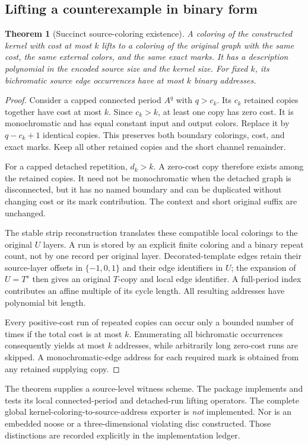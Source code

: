\documentclass[11pt]{article}
\newtheorem{theorem}{Theorem}[section]
\theoremstyle{remark}\newtheorem{remark}[theorem]{Remark}
\begin{document}
\subsection{Lifting a counterexample in binary form}
\begin{theorem}[Succinct source-coloring existence]\label{thm:lift}
A coloring of the constructed kernel with cost at most $k$ lifts to a coloring of the original graph with the same cost, the same external colors, and the same exact marks. It has a description polynomial in the encoded source size and the kernel size. For fixed $k$, its bichromatic source edge occurrences have at most $k$ binary addresses.
\end{theorem}
\begin{proof}
Consider a capped connected period $A^q$ with $q>c_k$. Its $c_k$ retained copies together have cost at most $k$. Since $c_k>k$, at least one copy has zero cost. It is monochromatic and has equal constant input and output colors. Replace it by $q-c_k+1$ identical copies. This preserves both boundary colorings, cost, and exact marks. Keep all other retained copies and the short channel remainder.

For a capped detached repetition, $d_k>k$. A zero-cost copy therefore exists among the retained copies. It need not be monochromatic when the detached graph is disconnected, but it has no named boundary and can be duplicated without changing cost or its mark contribution. The context and short original suffix are unchanged.

The stable strip reconstruction translates these compatible local colorings to the original $U$ layers. A run is stored by an explicit finite coloring and a binary repeat count, not by one record per original layer. Decorated-template edges retain their source-layer offsets in $\{-1,0,1\}$ and their edge identifiers in $U$; the expansion of $U=T^s$ then gives an original $T$-copy and local edge identifier. A full-period index contributes an affine multiple of its cycle length. All resulting addresses have polynomial bit length.

Every positive-cost run of repeated copies can occur only a bounded number of times if the total cost is at most $k$. Enumerating all bichromatic occurrences consequently yields at most $k$ addresses, while arbitrarily long zero-cost runs are skipped. A monochromatic-edge address for each required mark is obtained from any retained supplying copy.
\end{proof}
The theorem supplies a source-level witness scheme. The package implements and tests its local connected-period and detached-run lifting operators. The complete global kernel-coloring-to-source-address exporter is \emph{not} implemented. Nor is an embedded noose or a three-dimensional violating disc constructed. Those distinctions are recorded explicitly in the implementation ledger.
\end{document}
